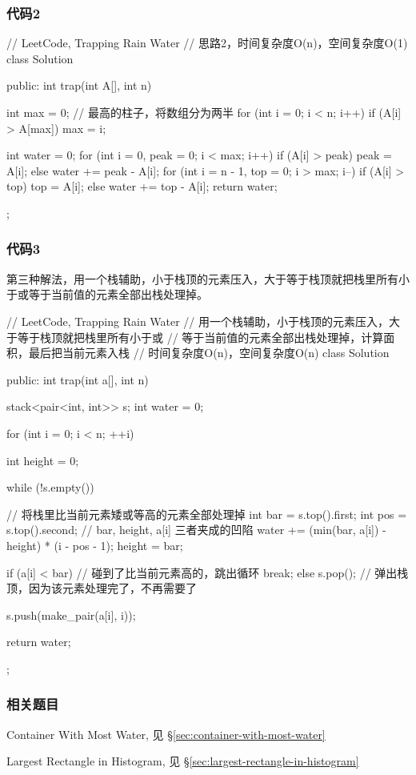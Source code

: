 \subsubsection{代码2}
\begin{Code}
// LeetCode, Trapping Rain Water
// 思路2，时间复杂度O(n)，空间复杂度O(1)
class Solution {
public:
    int trap(int A[], int n) {
        int max = 0; // 最高的柱子，将数组分为两半
        for (int i = 0; i < n; i++)
            if (A[i] > A[max]) max = i;

        int water = 0;
        for (int i = 0, peak = 0; i < max; i++)
            if (A[i] > peak) peak = A[i];
            else water += peak - A[i];
        for (int i = n - 1, top = 0; i > max; i--)
            if (A[i] > top) top = A[i];
            else water += top - A[i];
        return water;
    }
};
\end{Code}


\subsubsection{代码3}
第三种解法，用一个栈辅助，小于栈顶的元素压入，大于等于栈顶就把栈里所有小于或等于当前值的元素全部出栈处理掉。
\begin{Code}
// LeetCode, Trapping Rain Water
// 用一个栈辅助，小于栈顶的元素压入，大于等于栈顶就把栈里所有小于或
// 等于当前值的元素全部出栈处理掉，计算面积，最后把当前元素入栈
// 时间复杂度O(n)，空间复杂度O(n)
class Solution {
public:
    int trap(int a[], int n) {
        stack<pair<int, int>> s;
        int water = 0;

        for (int i = 0; i < n; ++i) {
            int height = 0;

            while (!s.empty()) { // 将栈里比当前元素矮或等高的元素全部处理掉
                int bar = s.top().first;
                int pos = s.top().second;
                // bar, height, a[i] 三者夹成的凹陷
                water += (min(bar, a[i]) - height) * (i - pos - 1);
                height = bar;

                if (a[i] < bar) // 碰到了比当前元素高的，跳出循环
                    break;
                else
                    s.pop(); // 弹出栈顶，因为该元素处理完了，不再需要了
            }

            s.push(make_pair(a[i], i));
        }

        return water;
    }
};
\end{Code}


\subsubsection{相关题目}
\begindot
\item Container With Most Water, 见 \S \ref{sec:container-with-most-water}
\item Largest Rectangle in Histogram, 见 \S \ref{sec:largest-rectangle-in-histogram}
\myenddot



